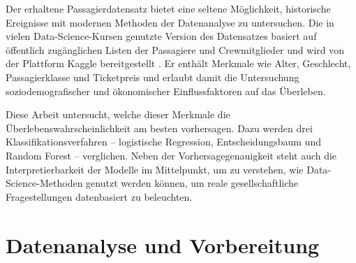 \documentclass[12pt,a4paper]{article}
\begin{document}
Der erhaltene Passagierdatensatz bietet eine seltene Möglichkeit, historische Ereignisse mit modernen Methoden der Datenanalyse zu untersuchen.
Die in vielen Data-Science-Kursen genutzte Version des Datensatzes basiert auf öffentlich zugänglichen Listen der Passagiere und Crew­mitglieder und wird von der Plattform Kaggle bereitgestellt \citep{KaggleTitanic}. Er enthält Merkmale wie Alter, Geschlecht, Passagierklasse und Ticketpreis und erlaubt damit die Untersuchung soziodemografischer und ökonomischer Einflussfaktoren auf das Überleben.

Diese Arbeit untersucht, welche dieser Merkmale die Überlebenswahrscheinlichkeit am besten vorhersagen. Dazu werden drei Klassifikationsverfahren – logistische Regression, Entscheidungsbaum und Random Forest – verglichen. Neben der Vorhersagegenauigkeit steht auch die Interpretierbarkeit der Modelle im Mittelpunkt, um zu verstehen,
wie Data-Science-Methoden genutzt werden können, um reale gesellschaftliche Fragestellungen datenbasiert zu beleuchten.

\section{Datenanalyse und Vorbereitung}


\end{document}
